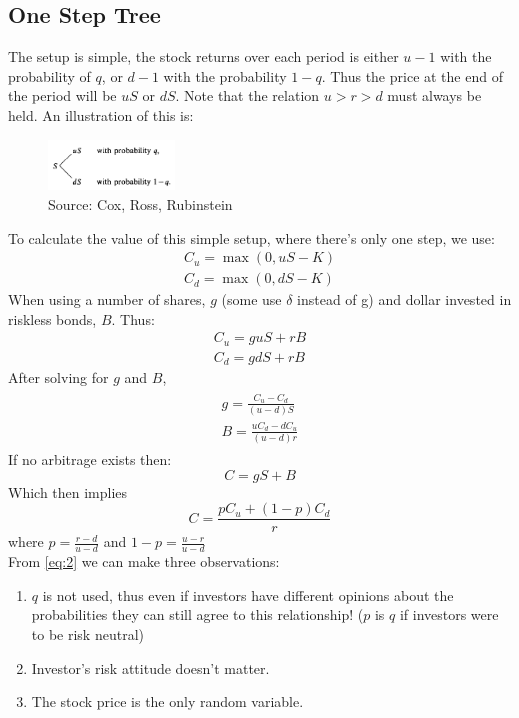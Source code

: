 \documentclass{article}
\DeclareMathOperator{\max}{max}
\begin{document}
\subsection{One Step Tree}
The setup is simple, the stock returns over each period is either $u - 1$ with the probability of $q$, or $d - 1$ with the probability $1 - q$. Thus the price at the end of the period will be $uS$ or $dS$. Note that the relation $u > r > d$ must always be held. An illustration of this is:

\begin{figure}
\centering
\includegraphics[width=0.3\textwidth]{one-step-tree.png}
\caption{\label{fig:onestep}Source: Cox, Ross, Rubinstein}
\end{figure}

To calculate the value of this simple setup, where there’s only one step, we use:
\begin{align*}
    C_{u} = \max(0, uS - K) \\
    C_{d} = \max(0, dS - K)
\end{align*}
When using a number of shares, $g$ (some use $\delta$ instead of g) and dollar invested in riskless bonds, $B$. Thus:
\begin{align*}
    C_{u} = g u S + r B \\
    C_{d} = g d S + r B 
\end{align*}
After solving for $g$ and $B$,
\begin{align}\label{eq:1}
    \begin{split}
    g = \frac{C_{u} - C_{d}}{(u - d)S} \\
    B = \frac{uC_{d} - dC_{u}}{(u - d)r}
    \end{split}
\end{align}
If no arbitrage exists then:
\begin{equation*}
    C = gS +B
\end{equation*}
Which then implies
\begin{equation}\label{eq:2}
    C = \frac{p C_{u} + (1 - p) C_{d}}{r}
\end{equation}
where $p=\frac{r-d}{u-d}$ and $1-p=\frac{u-r}{u-d}$ \\ [5ex]
From \ref{eq:2} we can make three observations:
\begin{enumerate}
    \item $q$ is not used, thus even if investors have different opinions about the probabilities they can still agree to this relationship! ($p$ is $q$ if investors were to be risk neutral)
    \item Investor’s risk attitude doesn’t matter.
    \item The stock price is the only random variable.
\end{enumerate}
\end{document}
